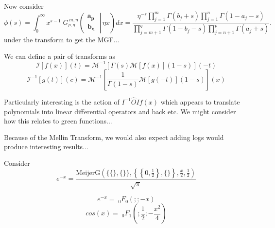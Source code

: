 \documentclass[journal=jcisd8,manuscript=article,layout=onecolumn,pdftex,floatfix,amsmath,amssymb,10pt]{achemso}
\begin{document}
Now consider 
$$
\phi(s) = \int_0^{\infty} x^{s - 1} \; G_{p,q}^{\,m,n} \!\left( \left. \begin{matrix} \mathbf{a_p} \\ \mathbf{b_q} \end{matrix} \; \right| \, \eta x \right) dx =
\frac{\eta^{-s} \prod_{j = 1}^{m} \Gamma (b_j + s) \prod_{j = 1}^{n} \Gamma (1 - a_j - s)} {\prod_{j = m + 1}^{q} \Gamma (1 - b_j - s) \prod_{j = n + 1}^{p} \Gamma (a_j + s)}.
$$
under the transform to get the MGF...


We can define a pair of transforms as 
$$
\mathcal{I}[f(x)](t) = \mathcal{M}^{-1}[\Gamma(s)\mathcal{M}[f(x)](1-s)](-t)
$$
$$
\mathcal{I}^{-1}[g(t)](c) = \mathcal{M}^{-1}[\frac{1}{\Gamma(1-s)}\mathcal{M}[g(-t)](1-s)](x)
$$

Particularly interesting is the action of $I^{-1} \hat{O} I f(x)$ which appears to translate polynomials into linear differential operators and back etc. We might consider how this relates to green functions... 

Because of the Mellin Transform, we would also expect adding logs would produce interesting results...




Consider 
$$
e^{-x} =  \frac{\text{MeijerG}\left(\{\{\},\{\}\},\left\{\left\{0,\frac{1}{2}\right\},\{\}\right\},\frac{x}{2},\frac{1}{2}\right)}{\sqrt{\pi }}
$$


$$
e^{-x} = \;_0F_0(;;-x)
$$
$$
cos(x) = \;_0F_1\left(;\frac{1}{2};-\frac{x^2}{4}\right)
$$
\end{document}
